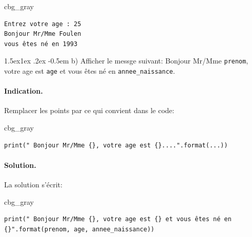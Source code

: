 \documentclass[%
oneside,                 %
final,                   %
10pt,french]{article}
\makeatletter
\newenvironment{_cod_tight}[1]{
   \def\FrameCommand{\colorbox{#1}}
   \FrameRule0.6pt\MakeFramed {\FrameRestore}\vskip3mm}
   {\vskip0mm\endMakeFramed}
\newenvironment{cod}[1]{
\bgroup\rmfamily
\fboxsep=0mm\relax
\begin{_cod_tight}{#1}
\list{}{\parsep=-2mm\parskip=0mm\topsep=0pt\leftmargin=2mm
\rightmargin=2\leftmargin\leftmargin=4pt\relax}
\item\relax}
{\endlist\end{_cod_tight}\egroup}
\newenvironment{doconceexercise}{}{}
\newcommand\subex{\@startsection{paragraph}{4}{\z@}%
                  {1.5ex\@plus1ex \@minus.2ex}%
                  {-0.5em}%
                  {\normalfont\normalsize\bfseries}}
\makeatother
\begin{document}
\begin{doconceexercise}
\begin{cod}{cbg_gray}
\begin{verbatim}
Entrez votre age : 25
Bonjour Mr/Mme Foulen
vous êtes né en 1993
\end{verbatim}
\end{cod}
\noindent

\subex{b)}
Afficher le messge suivant:
Bonjour Mr/Mme \texttt{prenom}, votre age est \texttt{age} et vous êtes né en \Verb!annee_naissance!.


\paragraph{Indication.}
Remplacer les points par ce qui convient dans le code:
\begin{cod}{cbg_gray}\begin{verbatim}
print(" Bonjour Mr/Mme {}, votre age est {}....".format(...))
\end{verbatim}
\end{cod}
\noindent



\paragraph{Solution.}
La solution s'écrit:
\begin{cod}{cbg_gray}\begin{verbatim}
print(" Bonjour Mr/Mme {}, votre age est {} et vous êtes né en {}".format(prenom, age, annee_naissance))
\end{verbatim}
\end{cod}
\noindent

\end{doconceexercise}



\end{document}
